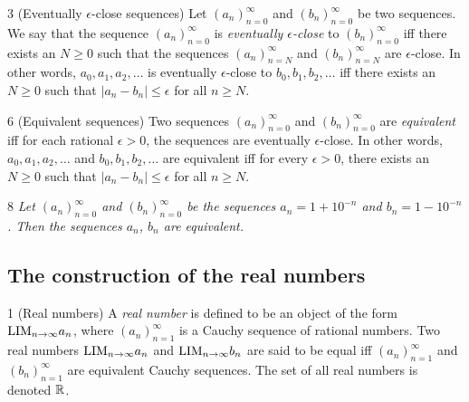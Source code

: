 \begin{definition}{3}
    \label{eventually-eps-close-seqs}
    (Eventually $\epsilon$-close sequences) Let $(a_n)_{n=0}^{\infty}$ and $(b_n)_{n=0}^{\infty}$
    be two sequences. We say that the sequence $(a_n)_{n=0}^{\infty}$ is \emph{eventually
    $\epsilon$-close} to $(b_n)_{n=0}^{\infty}$ iff there exists an $N \geq 0$ such that
    the sequences $(a_n)_{n=N}^{\infty}$ and $(b_n)_{n=N}^{\infty}$ are $\epsilon$-close.
    In other words, $a_0, a_1, a_2, \ldots$ is eventually $\epsilon$-close to $b_0, b_1, b_2, \ldots$
    iff there exists an $N \geq 0$ such that $|a_n - b_n| \leq \epsilon$ for all $n \geq N$.
\end{definition}

\begin{definition}{6}
    \label{equivalent-seqs}
    (Equivalent sequences) Two sequences $(a_n)_{n=0}^{\infty}$ and $(b_n)_{n=0}^{\infty}$
    are \emph{equivalent} iff for each rational $\epsilon > 0$, the sequences are eventually
    $\epsilon$-close. In other words, $a_0, a_1, a_2, \ldots$ and $b_0, b_1, b_2, \ldots$
    are equivalent iff for every $\epsilon > 0$, there exists an $N \geq 0$ such that
    $|a_n - b_n| \leq \epsilon$ for all $n \geq N$.
\end{definition}

\begin{proposition}{8}
    \label{equivalent-seqs-example}
    \emph{Let $(a_n)_{n=0}^{\infty}$ and $(b_n)_{n=0}^{\infty}$ be the sequences
    $a_n = 1 + 10^{-n}$ and $b_n = 1 - 10^{-n}$. Then the sequences $a_n$, $b_n$
    are equivalent.}
\end{proposition}

\subsection{The construction of the real numbers}
\begin{definition}{1}
    \label{real-number}
    (Real numbers) A \emph{real number} is defined to be an object of the form
    $\text{LIM}_{n \rightarrow \infty}{a_n}$, where $(a_n)_{n=1}^{\infty}$ is a Cauchy sequence
    of rational numbers. Two real numbers $\text{LIM}_{n \rightarrow \infty}{a_n}$ and
    $\text{LIM}_{n \rightarrow \infty}{b_n}$ are said to be equal iff $(a_n)_{n=1}^{\infty}$
    and $(b_n)_{n=1}^{\infty}$ are equivalent Cauchy sequences. The set of all
    real numbers is denoted $\mathbb{R}$.
\end{definition}

